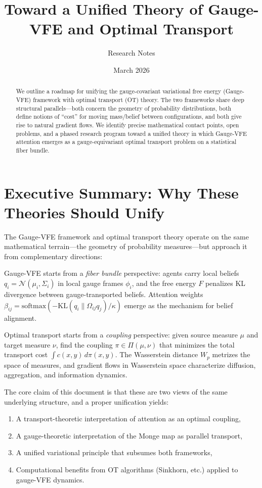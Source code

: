\documentclass[11pt]{article}
\title{Toward a Unified Theory of Gauge-VFE and Optimal Transport}
\author{Research Notes}
\date{March 2026}
\newcommand{\KL}{\mathrm{KL}}
\begin{document}
\maketitle

\begin{abstract}
We outline a roadmap for unifying the gauge-covariant variational free energy (Gauge-VFE) framework with optimal transport (OT) theory. The two frameworks share deep structural parallels---both concern the geometry of probability distributions, both define notions of ``cost'' for moving mass/belief between configurations, and both give rise to natural gradient flows. We identify precise mathematical contact points, open problems, and a phased research program toward a unified theory in which Gauge-VFE attention emerges as a gauge-equivariant optimal transport problem on a statistical fiber bundle.
\end{abstract}

\tableofcontents

\section{Executive Summary: Why These Theories Should Unify}

The Gauge-VFE framework and optimal transport theory operate on the same mathematical terrain---the geometry of probability measures---but approach it from complementary directions:

Gauge-VFE starts from a \emph{fiber bundle} perspective: agents carry local beliefs $q_i = \mathcal{N}(\mu_i, \Sigma_i)$ in local gauge frames $\phi_i$, and the free energy $F$ penalizes KL divergence between gauge-transported beliefs. Attention weights $\beta_{ij} = \text{softmax}(-\KL(q_i \| \Omega_{ij} q_j)/\kappa)$ emerge as the mechanism for belief alignment.

Optimal transport starts from a \emph{coupling} perspective: given source measure $\mu$ and target measure $\nu$, find the coupling $\pi \in \Pi(\mu,\nu)$ that minimizes the total transport cost $\int c(x,y)\,d\pi(x,y)$. The Wasserstein distance $W_p$ metrizes the space of measures, and gradient flows in Wasserstein space characterize diffusion, aggregation, and information dynamics.

The core claim of this document is that these are two views of the same underlying structure, and a proper unification yields:
\begin{enumerate}
    \item A transport-theoretic interpretation of attention as an optimal coupling,
    \item A gauge-theoretic interpretation of the Monge map as parallel transport,
    \item A unified variational principle that subsumes both frameworks,
    \item Computational benefits from OT algorithms (Sinkhorn, etc.) applied to gauge-VFE dynamics.
\end{enumerate}
\end{document}
